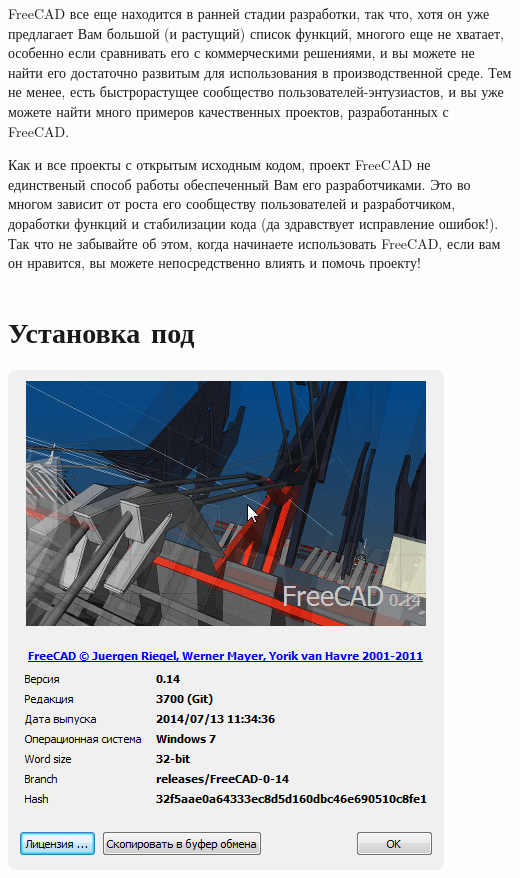 FreeCAD все еще находится в ранней стадии разработки, так что, хотя он уже
предлагает Вам большой (и растущий) список функций, многого еще не хватает,
особенно если сравнивать его с коммерческими решениями, и вы можете не найти его
достаточно развитым для использования в производственной среде. Тем не менее,
есть быстрорастущее сообщество пользователей-энтузиастов, и вы уже можете найти
много примеров качественных проектов, разработанных с FreeCAD.

Как и все проекты с открытым исходным кодом, проект FreeCAD не единственый
способ работы обеспеченный Вам его разработчиками. Это во многом зависит от
роста его сообществу пользователей и разработчиком, доработки функций и
стабилизации кода (да здравствует исправление ошибок!). Так что не забывайте об
этом, когда начинаете использовать FreeCAD, если вам он нравится, вы можете
непосредственно влиять и помочь проекту!

\section{Установка под \win}





\includegraphics[height=0.8\textheight]{freecad/about.png}

